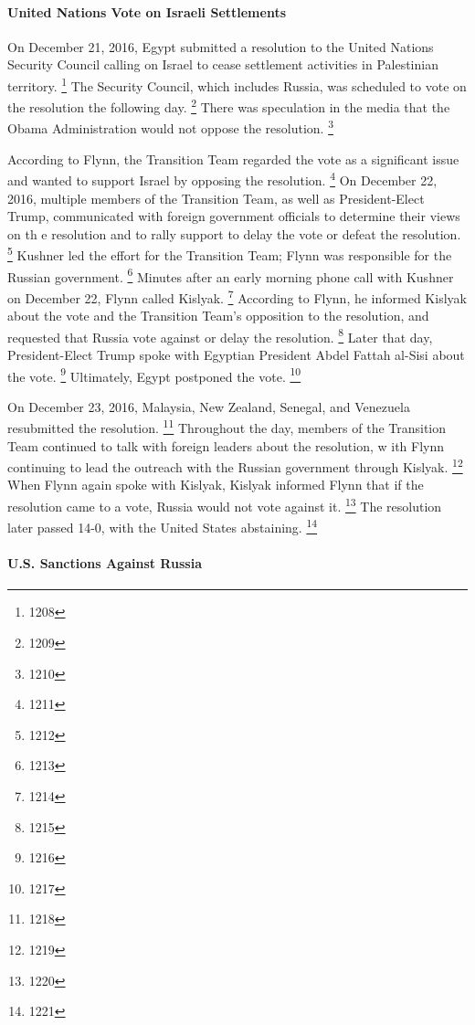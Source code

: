 \paragraph{United Nations Vote on Israeli Settlements}

On December 21, 2016, Egypt submitted a resolution to the United Nations Security Council calling on Israel to cease settlement activities in Palestinian territory.%
\footnote{1208}
The Security Council, which includes Russia, was scheduled to vote on the resolution the following day.%
\footnote{1209}
There was speculation in the media that the Obama Administration would not oppose the resolution.%
\footnote{1210}

According to Flynn, the Transition Team regarded the vote as a significant issue and wanted to support Israel by opposing the resolution.%
\footnote{1211}
On December 22, 2016, multiple members of the Transition Team, as well as President-Elect Trump, communicated with foreign government officials to determine their views on th e resolution and to rally support to delay the vote or defeat the resolution.%
\footnote{1212}
Kushner led the effort for the Transition Team; Flynn was responsible for the Russian government.%
\footnote{1213}
Minutes after an early morning phone call with Kushner on December 22, Flynn called Kislyak.%
\footnote{1214}
According to Flynn, he informed Kislyak about the vote and the Transition Team's opposition to the resolution, and requested that Russia vote against or delay the resolution.%
\footnote{1215}
Later that day, President-Elect Trump spoke with Egyptian President Abdel Fattah al-Sisi about the vote.%
\footnote{1216}
Ultimately, Egypt postponed the vote.%
\footnote{1217}

On December 23, 2016, Malaysia, New Zealand, Senegal, and Venezuela resubmitted the resolution.%
\footnote{1218}
Throughout the day, members of the Transition Team continued to talk with foreign leaders about the resolution, w ith Flynn continuing to lead the outreach with the Russian government through Kislyak.%
\footnote{1219}
When Flynn again spoke with Kislyak, Kislyak informed Flynn that if the resolution came to a vote, Russia would not vote against it. %
\footnote{1220}
The resolution later passed 14-0, with the United States abstaining.%
\footnote{1221}

\paragraph{U.S. Sanctions Against Russia}

